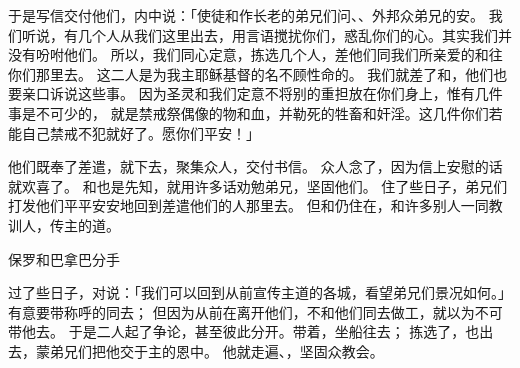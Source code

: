 {于是写信交付他们，内中说：「使徒和作长老的弟兄们问{}、{}、{}外邦众弟兄的安。
我们听说，有几个人从我们这里出去，用言语搅扰你们，惑乱你们的心。其实我们并没有吩咐他们。
所以，我们同心定意，拣选几个人，差他们同我们所亲爱的{}和{}往你们那里去。
这二人是为我主耶稣基督的名不顾性命的。
我们就差了{}和{}，他们也要亲口诉说这些事。
因为圣灵和我们定意不将别的重担放在你们身上，惟有几件事是不可少的，
就是禁戒祭偶像的物和血，并勒死的牲畜和奸淫。这几件你们若能自己禁戒不犯就好了。愿你们平安！」
\par }{\PP {}他们既奉了差遣，就下{}去，聚集众人，交付书信。
众人念了，因为信上安慰的话就欢喜了。
和{}也是先知，就用许多话劝勉弟兄，坚固他们。
住了些日子，弟兄们打发他们平平安安地回到差遣他们的人那里去。
但{}和{}仍住在{}，和许多别人一同教训人，传主的道。
\par }{\SH 保罗和巴拿巴分手
\par }{\PP {}过了些日子，{}对{}说：「我们可以回到从前宣传主道的各城，看望弟兄们景况如何。」
有意要带称呼{}的{}同去；
但{}因为{}从前在{}离开他们，不和他们同去做工，就以为不可带他去。
于是二人起了争论，甚至彼此分开。{}带着{}，坐船往{}去；
拣选了{}，也出去，蒙弟兄们把他交于主的恩中。
他就走遍{}、{}，坚固众教会。

}
